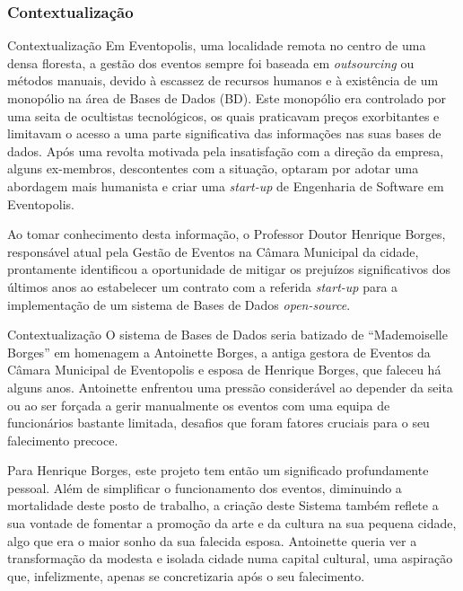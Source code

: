 \documentclass[compress,svgnames,handout,13.7pt]{beamer}
\begin{document}
\subsubsection{Contextualização}
\begin{frame}{Contextualização}
Em Eventopolis, uma localidade remota no centro de uma densa floresta, a gestão dos eventos sempre foi baseada em \textit{outsourcing} ou métodos manuais, devido à escassez de recursos humanos e à exist\^{e}ncia de um monopólio na área de Bases de Dados (BD). Este monopólio era controlado por uma seita de ocultistas tecnológicos, os quais praticavam preços exorbitantes e limitavam o acesso a uma parte significativa das informações nas suas bases de dados. Após uma revolta motivada pela insatisfação com a direção da empresa, alguns ex-membros, descontentes com a situação, optaram por adotar uma abordagem mais humanista e criar uma \textit{start-up} de Engenharia de Software em Eventopolis.
    
    Ao tomar conhecimento desta informação, o Professor Doutor Henrique Borges, responsável atual pela Gestão de Eventos na Câmara Municipal da cidade, prontamente identificou a oportunidade de mitigar os prejuízos significativos dos últimos anos ao estabelecer um contrato com a referida \textit{start-up} para a implementação de um sistema de Bases de Dados \textit{open-source}.
\end{frame}
\begin{frame}{Contextualização}
 O sistema de Bases de Dados seria batizado de ``Mademoiselle Borges'' em homenagem a Antoinette Borges, a antiga gestora de Eventos da Câmara Municipal de Eventopolis e esposa de Henrique Borges, que faleceu há alguns anos. Antoinette enfrentou uma pressão considerável ao depender da seita ou ao ser forçada a gerir manualmente os eventos com uma equipa de funcionários bastante limitada, desafios que foram fatores cruciais para o seu falecimento precoce.
   
Para Henrique Borges, este projeto tem então um significado profundamente pessoal. Além de simplificar o funcionamento dos eventos, diminuindo a mortalidade deste posto de trabalho, a criação deste Sistema também reflete a sua vontade de fomentar a promoção da arte e da cultura na sua pequena cidade, algo que era o maior sonho da sua falecida esposa. Antoinette queria ver a transformação da modesta e isolada cidade numa capital cultural, uma aspiração que, infelizmente, apenas se concretizaria após o seu falecimento.
\end{frame}
\end{document}
